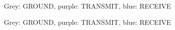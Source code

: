 \documentclass[a4paper, 12pt]{article}
\begin{document}
\begin{figure}
\caption{Grey: GROUND, purple: TRANSMIT, blue: RECEIVE}
\label{fig:serialsetup1}
\end{figure}

\begin{figure}
\caption{Grey: GROUND, purple: TRANSMIT, blue: RECEIVE}
\label{fig:serialsetup2}
\end{figure}
\end{document}
